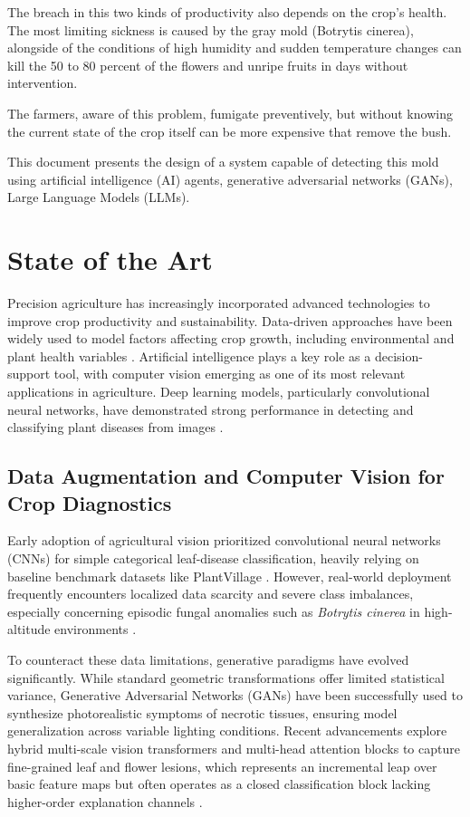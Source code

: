 \documentclass[11pt]{article}
\begin{document}
The breach in this two kinds of productivity also depends on the crop's health. The most limiting sickness is caused by the gray mold (Botrytis cinerea), alongside of the conditions of high humidity and sudden temperature changes can kill the 50 to 80 percent of the flowers and unripe fruits in days without intervention\cite{ABBEY2024106633}.

The farmers, aware of this problem, fumigate preventively, but without knowing the current state of the crop itself can be more expensive that remove the bush.

This document presents the design of a system capable of detecting this mold using artificial intelligence (AI) agents, generative adversarial networks (GANs), Large Language Models (LLMs).

\section{State of the Art}
Precision agriculture has increasingly incorporated advanced technologies to improve crop productivity and sustainability. Data-driven approaches have been widely used to model factors affecting crop growth, including environmental and plant health variables \cite{JIN2026101336}. Artificial intelligence plays a key role as a decision-support tool, with computer vision emerging as one of its most relevant applications in agriculture. Deep learning models, particularly convolutional neural networks, have demonstrated strong performance in detecting and classifying plant diseases from images \cite{plantdlreview}.

\subsection{Data Augmentation and Computer Vision for Crop Diagnostics}
Early adoption of agricultural vision prioritized convolutional neural networks (CNNs) for simple categorical leaf-disease classification, heavily relying on baseline benchmark datasets like PlantVillage \cite{plantdlreview}. However, real-world deployment frequently encounters localized data scarcity and severe class imbalances, especially concerning episodic fungal anomalies such as \textit{Botrytis cinerea} in high-altitude environments \cite{ABBEY2024106633}. 

To counteract these data limitations, generative paradigms have evolved significantly. While standard geometric transformations offer limited statistical variance, Generative Adversarial Networks (GANs) have been successfully used to synthesize photorealistic symptoms of necrotic tissues, ensuring model generalization across variable lighting conditions. Recent advancements explore hybrid multi-scale vision transformers and multi-head attention blocks to capture fine-grained leaf and flower lesions, which represents an incremental leap over basic feature maps but often operates as a closed classification block lacking higher-order explanation channels \cite{kinyanjui_mhsa}.
\end{document}
